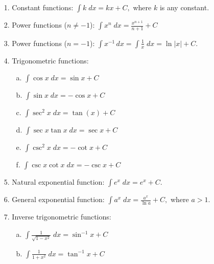 \documentclass[handout]{ximera}
\begin{document}
\begin{enumerate}


\item[1.] Constant functions:
$\displaystyle
\int k \; dx = kx + C,
$
where $k$ is any constant.

\item[2.] Power functions ($n \neq -1$):
$\displaystyle
\int x^n \; dx = \frac{x^{n+1}}{n+1} + C
$


\item[3.] Power functions ($n = -1$):
$\displaystyle
 \int x^{-1} \, dx = \int \frac{1}{x} \; dx = \ln|x| + C.
$

\item[4.] Trigonometric functions:

\begin{enumerate}

\item[a.] $\displaystyle{\int \cos x \; dx = \sin x + C}$
\item[b.] $\displaystyle{\int \sin x \; dx = -\cos x + C}$
\item[c.] $\displaystyle{\int \sec^2 x \; dx = \tan(x) + C}$
\item[d.] $\displaystyle{\int \sec x \tan x \; dx = \sec x + C}$
\item[e.] $\displaystyle{\int \csc^2 x \; dx = -\cot x + C}$
\item[f.] $\displaystyle{\int \csc x \cot x \; dx = -\csc x + C}$
 
\end{enumerate}


\item[5.] Natural exponential function:
$\displaystyle
\int e^x \; dx = e^x + C.
$

\item[6.] General exponential function:
$\displaystyle
\int a^x \; dx = \frac{a^x}{\ln a} + C,
$
where $a > 1$.

\item[7.] Inverse trigonometric functions:

\begin{enumerate}

\item[a.] $\displaystyle{\int \frac{1}{\sqrt{1-x^2}} \; dx = \sin^{-1} x + C}$
\item[b.] $\displaystyle{\int \frac{1}{1+x^2} \; dx = \tan^{-1} x + C}$

\end{enumerate}


\end{enumerate}
\end{document}
